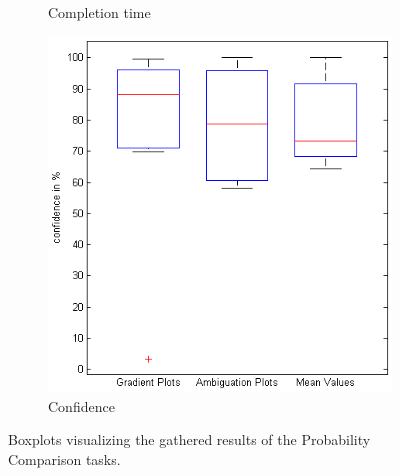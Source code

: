 \begin{figure}[H]
\begin{subfigure}[b]{0.32\textwidth}
        \caption{Completion time}
        \label{fig:s2_time}
    \end{subfigure}
		\begin{subfigure}[b]{0.32\textwidth}
        \includegraphics[width=\textwidth]{figures/boxplots/s2_confidence.png}
        \caption{Confidence}
        \label{fig:s2_confidence}
    \end{subfigure}
    \caption{Boxplots visualizing the gathered results of the Probability Comparison tasks.}
		\label{fig:s2_boxplots}
\end{figure}

